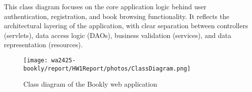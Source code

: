 This class diagram focuses on the core application logic behind user authentication, registration, and book browsing functionality. It reflects the architectural layering of the application, with clear separation between controllers (servlets), data access logic (DAOs), business validation (services), and data representation (resources).



\begin{figure}[h]
    \centering
    \texttt{[image: wa2425-bookly/report/HW1Report/photos/ClassDiagram.png]}
    \caption{Class diagram of the Bookly web application}
    \label{fig:classdiagram}
\end{figure}